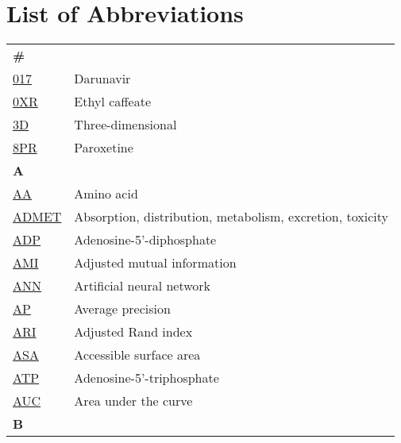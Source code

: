\chapter*{List of Abbreviations}

\begin{longtable}[l]{@{}p{2.5cm}p{12cm}@{}}
\textbf{\large \#} & \\[0.25cm]
\textmd{\href{https://www.ebi.ac.uk/pdbe-srv/pdbechem/chemicalCompound/show/017}{017}} & Darunavir \\
\textmd{\href{https://www.ebi.ac.uk/pdbe-srv/pdbechem/chemicalCompound/show/0XR}{0XR}} & Ethyl caffeate \\
\textmd{\href{https://en.wikipedia.org/wiki/Three-dimensional_space}{3D}} & Three-dimensional \\
\textmd{\href{https://www.ebi.ac.uk/pdbe-srv/pdbechem/chemicalCompound/show/8PR}{8PR}} & Paroxetine \\[0.3175cm]
\textbf{\large A} & \\[0.25cm]
\textmd{\href{https://en.wikipedia.org/wiki/Amino_acid}{AA}} & Amino acid \\
\textmd{\href{https://en.wikipedia.org/wiki/ADME}{ADMET}} & Absorption, distribution, metabolism, excretion, toxicity \\
\textmd{\href{https://www.ebi.ac.uk/pdbe-srv/pdbechem/chemicalCompound/show/ADP}{ADP}} & Adenosine-5'-diphosphate \\
\textmd{\href{https://en.wikipedia.org/wiki/Adjusted_mutual_information}{AMI}} & Adjusted mutual information \\
\textmd{\href{https://en.wikipedia.org/wiki/Neural_network_(machine_learning)}{ANN}} & Artificial neural network \\
\textmd{\href{https://en.wikipedia.org/wiki/Evaluation_measures_(information_retrieval)}{AP}} & Average precision \\
\textmd{\href{https://en.wikipedia.org/wiki/Rand_index}{ARI}} & Adjusted Rand index \\
\textmd{\href{https://en.wikipedia.org/wiki/Accessible_surface_area}{ASA}} & Accessible surface area \\
\textmd{\href{https://www.ebi.ac.uk/pdbe-srv/pdbechem/chemicalCompound/show/ATP}{ATP}} & Adenosine-5’-triphosphate \\
\textmd{\href{https://en.wikipedia.org/wiki/Receiver_operating_characteristic}{AUC}} & Area under the curve \\[0.3175cm]
\textbf{\large B} & \\[0.25cm]

\end{longtable}
